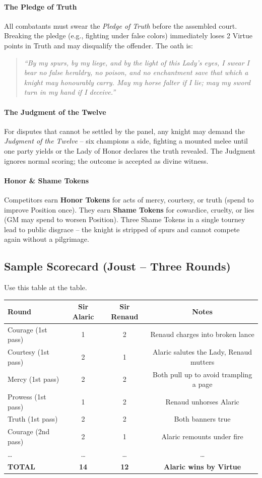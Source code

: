 \documentclass[11pt,twoside]{book}
\begin{document}
\paragraph{The Pledge of Truth}
All combatants must swear the \textit{Pledge of Truth} before the assembled court. Breaking the pledge (e.g., fighting under false colors) immediately loses 2 Virtue points in Truth and may disqualify the offender. The oath is:
\begin{quote}
\emph{``By my spurs, by my liege, and by the light of this Lady's eyes, I swear I bear no false heraldry, no poison, and no enchantment save that which a knight may honourably carry. May my horse falter if I lie; may my sword turn in my hand if I deceive.''}
\end{quote}

\paragraph{The Judgment of the Twelve}
For disputes that cannot be settled by the panel, any knight may demand the \textit{Judgment of the Twelve} -- six champions a side, fighting a mounted melee until one party yields or the Lady of Honor declares the truth revealed. The Judgment ignores normal scoring; the outcome is accepted as divine witness.
\paragraph{Honor & Shame Tokens}
Competitors earn \textbf{Honor Tokens} for acts of mercy, courtesy, or truth (spend to improve Position once). They earn \textbf{Shame Tokens} for cowardice, cruelty, or lies (GM may spend to worsen Position). Three Shame Tokens in a single tourney lead to public disgrace -- the knight is stripped of spurs and cannot compete again without a pilgrimage.

\subsection*{Sample Scorecard (Joust -- Three Rounds)}
Use this table at the table.

\noindent
\begin{tabular}{|l|c|c|c|}
\hline
\textbf{Round} & \textbf{Sir Alaric} & \textbf{Sir Renaud} & \textbf{Notes} \\
\hline
Courage (1st pass) & 1 & 2 & Renaud charges into broken lance \\
Courtesy (1st pass) & 2 & 1 & Alaric salutes the Lady, Renaud mutters \\
Mercy (1st pass) & 2 & 2 & Both pull up to avoid trampling a page \\
Prowess (1st pass) & 1 & 2 & Renaud unhorses Alaric \\
Truth (1st pass) & 2 & 2 & Both banners true \\
\hline
Courage (2nd pass) & 2 & 1 & Alaric remounts under fire \\
\dots & \dots & \dots & \dots \\
\hline
\textbf{TOTAL} & \textbf{14} & \textbf{12} & \textbf{Alaric wins by Virtue} \\
\hline
\end{tabular}
\end{document}
